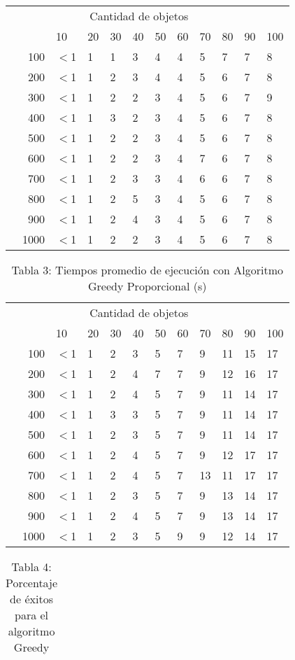 \documentclass{article}
\begin{document}
\begin{center}
\begin{table}[ht]
\begin{tabularx}{0.8\textwidth}{Xr|XXXXXXXXXX}
&\multicolumn{10}{c}{Cantidad de objetos} \\
&&10&20&30&40&50&60&70&80&90&100\\\hline
\parbox[t]{2mm}{}&100&$<$1&1&1&3&4&4&5&7&7&8\\
&200&$<$1&1&2&3&4&4&5&6&7&8\\
&300&$<$1&1&2&2&3&4&5&6&7&9\\
&400&$<$1&1&3&2&3&4&5&6&7&8\\
&500&$<$1&1&2&2&3&4&5&6&7&8\\
&600&$<$1&1&2&2&3&4&7&6&7&8\\
&700&$<$1&1&2&3&3&4&6&6&7&8\\
&800&$<$1&1&2&5&3&4&5&6&7&8\\
&900&$<$1&1&2&4&3&4&5&6&7&8\\
&1000&$<$1&1&2&2&3&4&5&6&7&8\\
\end{tabularx}
\end{table}
\begin{table}[ht]
\centering
\caption*{Tabla 3: Tiempos promedio de ejecución con Algoritmo Greedy Proporcional (\textmu s)}
\label{3}
\begin{tabularx}{0.8\textwidth}{Xr|XXXXXXXXXX}
&\multicolumn{10}{c}{Cantidad de objetos} \\
&&10&20&30&40&50&60&70&80&90&100\\\hline
\parbox[t]{2mm}{}&100&$<$1&1&2&3&5&7&9&11&15&17\\
&200&$<$1&1&2&4&7&7&9&12&16&17\\
&300&$<$1&1&2&4&5&7&9&11&14&17\\
&400&$<$1&1&3&3&5&7&9&11&14&17\\
&500&$<$1&1&2&3&5&7&9&11&14&17\\
&600&$<$1&1&2&4&5&7&9&12&17&17\\
&700&$<$1&1&2&4&5&7&13&11&17&17\\
&800&$<$1&1&2&3&5&7&9&13&14&17\\
&900&$<$1&1&2&4&5&7&9&13&14&17\\
&1000&$<$1&1&2&3&5&9&9&12&14&17\\
\end{tabularx}
\end{table}
\begin{table}[ht]
\centering
\caption*{Tabla 4: Porcentaje de éxitos para el algoritmo Greedy}
\label{4}
\begin{tabularx}{0.8\textwidth}{Xr|XXXXXXXXXX}

\end{tabularx}
\end{table}
\end{center}
\end{document}
